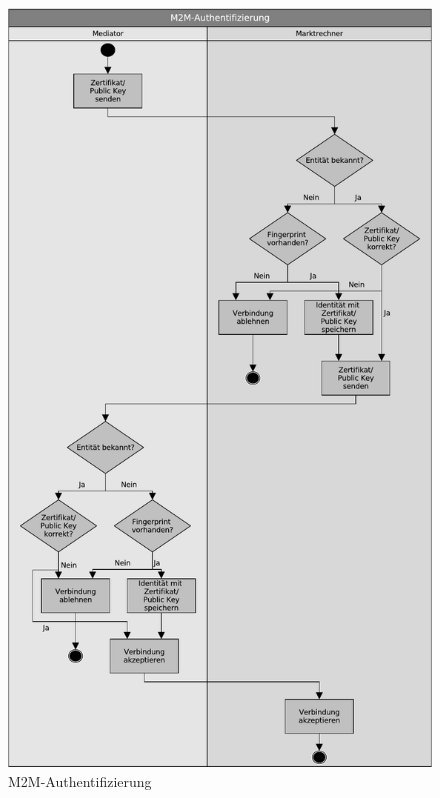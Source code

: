 \documentclass[11pt,a4paper]{report}
\begin{document}
\begin{figure}[htbp]
\centering
\includegraphics[scale=0.7]{images/design_architecture_auth_m2m_h.pdf}
\caption{M2M-Authentifizierung}
\label{fig:design_authm2m}
\end{figure} 
\end{document}
